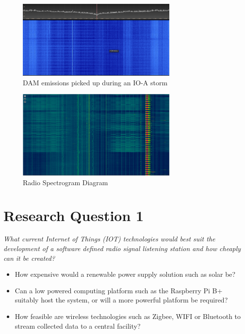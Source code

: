 \documentclass[runningheads,a4paper]{llncs}
\begin{document}
%
\begin{figure}[here]
	\centering
	\includegraphics[width=8cm]{images/54}
	\caption{\gls{DAM} emissions picked up during an IO-A storm}
	\label{fig:dam_emissions_io_a_april_23}
\end{figure}
%

%
\begin{figure}[here]
	\centering
	\includegraphics[width=8cm]{images/55}
	\caption{Radio Spectrogram Diagram \citep{superkuh-15}}
	\label{fig:wide_radio_spectrogram}
\end{figure}
%





%
%
\newpage
\chapter*{Research Question 1}

\textit{What current Internet of Things (\gls{IOT}) technologies would best suit the development of a software defined radio signal listening station and how cheaply can it be created?}

\begin{itemize}
	\item How expensive would a renewable power supply solution such as solar be?
  	\item Can a low powered computing platform such as the Raspberry Pi B+ suitably host the system, or will a more powerful platform be required?
  	\item How feasible are wireless technologies such as Zigbee, WIFI or Bluetooth to stream collected data to a central facility?
\end{itemize}
\end{document}
